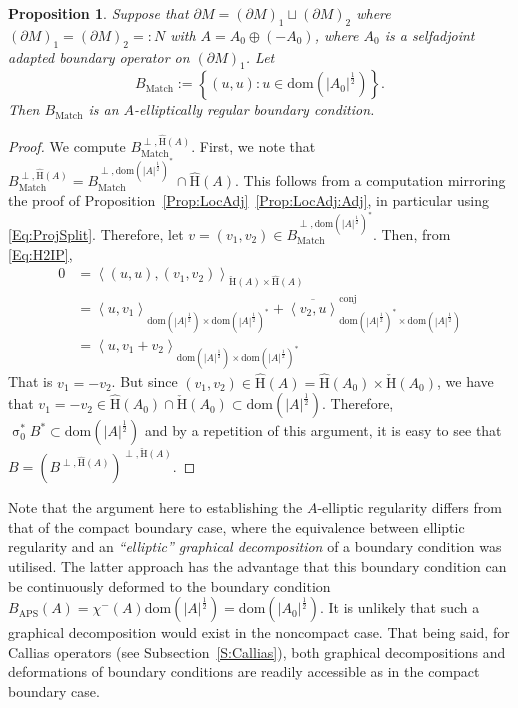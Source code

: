 \documentclass[a4paper,10pt,reqno]{amsart}
\newcommand{\sym}{\upsigma}
\newcommand{\dbrac}[1]{\left\{#1\right\}}
\newcommand{\modulus}[1]{|#1|}
\newcommand{\set}[1]{\dbrac{#1}}
\newcommand{\checkH}{\check{\mathrm{H}}}
\newcommand{\hatH}{\hat{\mathrm{H}}}
\newcommand{\dom}{\mathrm{dom}}
\newcommand{\inprod}[1]{\left\langle #1 \right\rangle}%
\newcommand{\APS}{\mathrm{APS}}
\newcommand{\Match}{\mathrm{Match}}
\newcommand{\dM}{\partial M}
\newtheorem{proposition}[theorem]{Proposition}
\theoremstyle{definition}
\begin{document}
\begin{proposition}
\label{Prop:MatchingBC}
Suppose that $\dM = (\dM)_1 \sqcup (\dM)_2$ where $(\dM)_1 = (\dM)_2 =: N$ with $A = A_0 \oplus (-A_0)$, where $A_0$ is a selfadjoint adapted boundary operator on $(\dM)_1$.
Let
$$B_{\Match} := \set{(u, u): u \in \dom(\modulus{A_0}^{\frac12})}.$$
Then $B_{\Match}$ is an $A$-elliptically regular boundary condition.
\end{proposition}
\begin{proof}
We compute $B_{\Match}^{\perp, \hatH(A)}$.
First, we note that $B_{\Match}^{\perp, \hatH(A)} = B_{\Match}^{\perp, \dom(\modulus{A}^{\frac12})^\ast} \cap \hatH(A)$.
This follows from a computation mirroring the proof of Proposition~\ref{Prop:LocAdj}~\ref{Prop:LocAdj:Adj}, in particular using \eqref{Eq:ProjSplit}.
Therefore, let $v = (v_1, v_2) \in B_{\Match}^{\perp, \dom(\modulus{A}^{\frac12})^\ast}$.
Then, from \eqref{Eq:H2IP},
\begin{align*}
0 & = \inprod{(u,u),(v_1,v_2)}_{\checkH(A) \times \hatH(A)}                                                                                                                                                   \\
  & = \inprod{u, v_1}_{\dom(\modulus{A}^{\frac12}) \times \dom(\modulus{A}^{\frac12})^\ast} + \overline{\inprod{v_2,u}}^{\mathrm{conj}}_{\dom(\modulus{A}^{\frac12})^\ast \times \dom(\modulus{A}^{\frac12})} \\
  & = \inprod{u, v_1 + v_2}_{\dom(\modulus{A}^{\frac12}) \times \dom(\modulus{A}^{\frac12})^\ast}
\end{align*}
That is $v_1 = -v_2$.
But since $(v_1, v_2) \in \hatH(A) = \hatH(A_0) \times \checkH(A_0)$, we have that $v_1 = -v_2 \in \hatH(A_0) \cap \checkH(A_0) \subset \dom(\modulus{A}^{\frac12})$.
Therefore, $\sym_0^\ast B^{\ast} \subset \dom(\modulus{A}^{\frac12})$ and by a repetition of this argument, it is easy to see that $B = (B^{\perp, \hatH(A)})^{\perp, \checkH(A)}$.
\end{proof}

Note that the argument here to establishing the $A$-elliptic regularity differs from that of the compact boundary case, where the equivalence between elliptic regularity and an \emph{``elliptic'' graphical decomposition} of a boundary condition was utilised.
The latter approach has the advantage that this boundary condition can be continuously deformed to the boundary condition $B_{\APS}(A) = \chi^-(A)\dom(\modulus{A}^{\frac12}) = \dom(\modulus{A_0}^{\frac12})$.
It is unlikely that  such a graphical decomposition would exist in the noncompact case.
That being said, for Callias operators (see Subsection~\ref{S:Callias}), both graphical decompositions and deformations of boundary conditions are readily accessible as in the compact boundary case.
\end{document}

